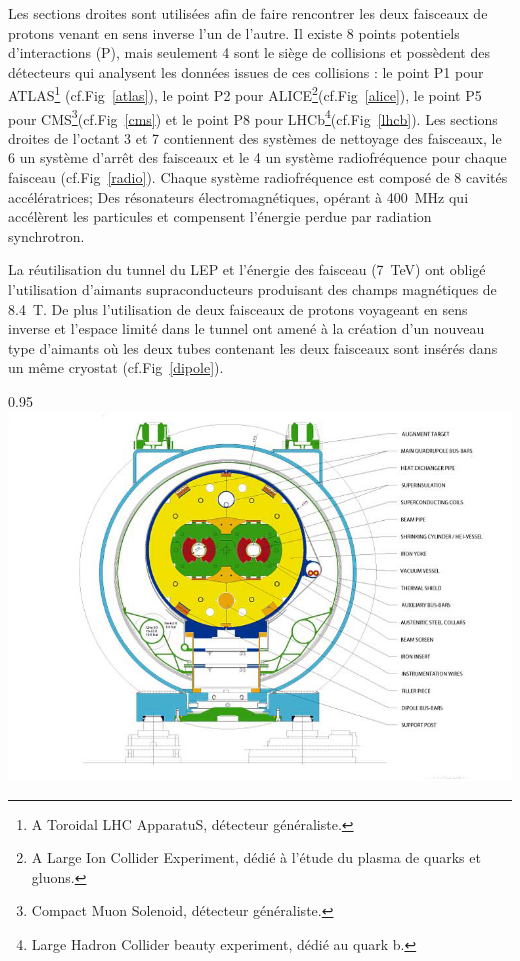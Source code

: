 Les sections droites sont utilisées afin de faire rencontrer les deux faisceaux de protons venant en sens inverse l'un de l'autre. Il existe \num{8} points potentiels d'interactions (P), mais seulement \num{4} sont le siège de collisions et possèdent des détecteurs qui analysent les données issues de ces collisions : le point P1 pour ATLAS\footnote{A Toroidal LHC ApparatuS, détecteur généraliste.} (cf.Fig~\ref{atlas}), le point P2 pour ALICE\footnote{A Large Ion Collider Experiment, dédié à l'étude du plasma de quarks et gluons.}(cf.Fig~\ref{alice}), le point P5 pour CMS\footnote{Compact Muon Solenoid, détecteur généraliste.}(cf.Fig~\ref{cms}) et le point P8 pour LHCb\footnote{Large Hadron Collider beauty experiment, dédié au quark b.}(cf.Fig~\ref{lhcb}). Les sections droites de l'octant \num{3} et \num{7} contiennent des systèmes de nettoyage des faisceaux, le \num{6} un système d'arrêt des faisceaux et le \num{4} un système radiofréquence pour chaque faisceau (cf.Fig~\ref{radio}). Chaque système radiofréquence est composé de \num{8} cavités accélératrices; Des résonateurs électromagnétiques, opérant à \SI{400}{\mega\hertz} qui accélèrent les particules et compensent l'énergie perdue par radiation synchrotron.

La réutilisation du tunnel du LEP et l'énergie des faisceau (\SI{7}{\tera\eV}) ont obligé l'utilisation d'aimants supraconducteurs produisant des champs magnétiques de \SI{8.4}{\tesla}. De plus l'utilisation de deux faisceaux de protons voyageant en sens inverse et l'espace limité dans le tunnel ont amené à la création d'un nouveau type d'aimants où les deux tubes contenant les deux faisceaux sont insérés dans un même cryostat (cf.Fig~\ref{dipole}).

\begin{minipagewithmarginpars}[ht!]{0.95\textwidth}
\centering
\includegraphics[width=1.0\textwidth]{LHC/dipole.jpg}
\label{dipole}	
\end{minipagewithmarginpars}

